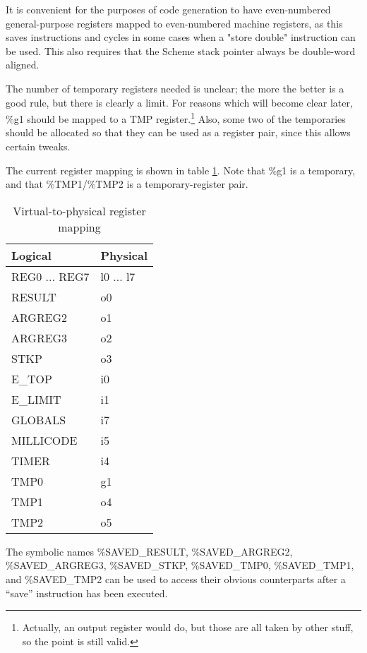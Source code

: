 It is convenient for the purposes of code generation to have
even-numbered general-purpose registers mapped to even-numbered
machine registers, as this saves instructions and cycles in some cases
when a "store double" instruction can be used. This also requires that
the Scheme stack pointer always be double-word aligned.

The number of temporary registers needed is unclear; the more the better is
a good rule, but there is clearly a limit. For reasons which will become
clear later, \%g1 should be mapped to a TMP register.\footnote{Actually,
an output register would do, but those are all taken by other stuff, so
the point is still valid.} Also, some two of the
temporaries should be allocated so that they can be used as a register pair,
since this allows certain tweaks.

The current register mapping is shown in table \ref{mappings}.
Note that \%g1 is a temporary, and that \%TMP1/\%TMP2 is a temporary-register
pair.


\begin{table}[hbt]
\begin{center}
\begin{tabular}{|l|l|} \hline
Logical & Physical \\ \hline\hline
   REG0 ... REG7 &  l0 ... l7  \\
   RESULT        &  o0 \\
   ARGREG2       &  o1 \\
   ARGREG3       &  o2 \\
   STKP          &  o3 \\
   E\_TOP        & i0 \\
   E\_LIMIT      & i1 \\
   GLOBALS       &  i7 \\
   MILLICODE     &  i5 \\
   TIMER         &  i4 \\
   TMP0          &  g1 \\
   TMP1          &  o4 \\
   TMP2          &  o5 \\ \hline
\end{tabular}
\end{center}
\caption{Virtual-to-physical register mapping}
\label{mappings}
\end{table}

The symbolic names \%SAVED\_RESULT, \%SAVED\_ARGREG2, \%SAVED\_ARGREG3,
\%SAVED\_STKP, \%SAVED\_TMP0, \%SAVED\_TMP1, and \%SAVED\_TMP2 can be 
used to access their obvious counterparts after a ``save'' instruction has
been executed.

